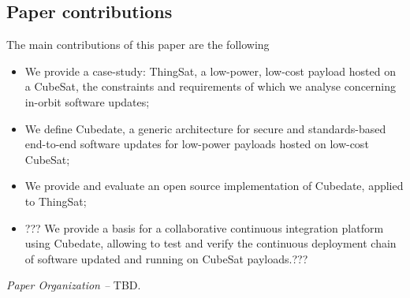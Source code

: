 \subsection*{Paper contributions}
The main contributions of this paper are the following
\begin{itemize}
    \item We provide a case-study: ThingSat, a low-power, low-cost payload hosted on a CubeSat, the constraints and requirements of which we analyse concerning in-orbit software updates;
    \item We define Cubedate, a generic architecture for secure and standards-based end-to-end software updates for low-power payloads hosted on low-cost CubeSat;
    \item We provide and evaluate an open source implementation of Cubedate, applied to ThingSat;
    \item ??? We provide a basis for a collaborative continuous integration platform using Cubedate, allowing to test and verify the continuous deployment chain of software updated and running on CubeSat payloads.???
\end{itemize}

\textit{Paper Organization --}
TBD.


\iffalse

